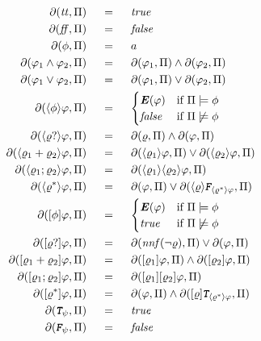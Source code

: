 \begin{align}
\begin{aligned}
\Dfun{\ttrue} 			\ind &= \ind \true\\
\Dfun{\ffalse} 			\ind &= \ind \false\\
\Dfun{\PropFormula}   	\ind &= \ind a\\
\Dfun{\varphi_1 \lAND \varphi_2} 			\ind &= \ind   \Dfun{\varphi_1} \lAND \Dfun{\varphi_2}\\
\Dfun{\varphi_1 \lOR  \varphi_2} 			\ind &= \ind   \Dfun{\varphi_1} \lOR \Dfun{\varphi_2}\\
\Dfun{\DIAM{\PropFormula}\varphi}             \ind &= \ind 
	\begin{cases}
		\textbf{\textit{E}}(\varphi) 	& \text{if}\ \PropInt \models \PropFormula\\
		\false     						& \text{if}\ \PropInt \not\models \PropFormula\\
	\end{cases}\\
\Dfun{\DIAM{\regexp?}\varphi}             			\ind &= \ind \Dfun{\regexp} \lAND \Dfun{\varphi}\\
\Dfun{\DIAM{\regexp_1 + \regexp_2}\varphi}             \ind &= \ind \Dfun{\DIAM{\regexp_1}\varphi} \lOR \Dfun{\DIAM{\regexp_2}\varphi}\\
\Dfun{\DIAM{\regexp_1 ; \regexp_2}\varphi}             \ind &= \ind \Dfun{\DIAM{\regexp_1}\DIAM{\regexp_2}\varphi}\\
\Dfun{\DIAM{\regexp^*}\varphi}             			\ind &= \ind \Dfun{\varphi} \lOR \Dfun{\DIAM{\regexp}\FalseDelta{\DIAM{\regexp^*}\varphi}}\\
\Dfun{\BOX{\PropFormula}\varphi}             \ind &= \ind 
	\begin{cases}
		\textbf{\textit{E}}(\varphi) 	& \text{if}\ \PropInt \models \PropFormula\\
		\true     						& \text{if}\ \PropInt \not\models \PropFormula\\
	\end{cases}\\
\Dfun{\BOX{\regexp?}\varphi}             			\ind &= \ind \Dfun{\nnf(\lnot \regexp)} \lOR \Dfun{\varphi}\\
\Dfun{\BOX{\regexp_1 + \regexp_2}\varphi}             \ind &= \ind \Dfun{\BOX{\regexp_1}\varphi} \lAND \Dfun{\BOX{\regexp_2}\varphi}\\
\Dfun{\BOX{\regexp_1 ; \regexp_2}\varphi}             \ind &= \ind \Dfun{\BOX{\regexp_1}\BOX{\regexp_2}\varphi}\\
\Dfun{\BOX{\regexp^*}\varphi}             			\ind &= \ind \Dfun{\varphi} \lAND \Dfun{\BOX{\regexp}\TrueDelta{\DIAM{\regexp^*}\varphi}}\\
\Dfun{\TrueDelta{\psi}} 			\ind &= \ind \true\\
\Dfun{\FalseDelta{\psi}} 			\ind &= \ind \false \label{delta-ldlf}
\end{aligned}					
\end{align}
